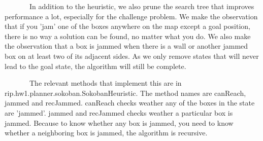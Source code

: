 \documentclass[]{article}
\begin{document}
\begin{enumerate}[(a)]
		~~~~~~~In addition to the heuristic, we also prune the search tree that improves performance a lot, especially for the challenge problem. We make the observation that if you 'jam' one of the boxes anywhere on the map except a goal position, there is no way a solution can be found, no matter what you do. We also make the observation that a box is jammed when there is a wall or another jammed box on at least two of its adjacent sides. As we only remove states that will never lead to the goal state, the algorithm will still be complete. 
		
		~~~~~~~The relevant methods that implement this are in rip.hw1.planner.sokoban.SokobanHeuristic. The method names are canReach, jammed and recJammed. canReach checks weather any of the boxes in the state are 'jammed'. jammed and recJammed checks weather a particular box is jammed. Because to know whether any box is jammed, you need to know whether a neighboring box is jammed, the algorithm is recursive.
		
	\end{enumerate}
	
\end{document}
